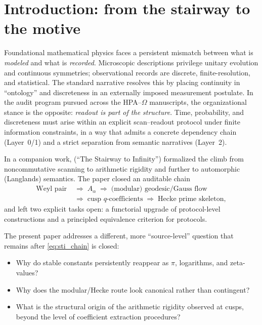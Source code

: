 
\section{Introduction: from the stairway to the motive}
\label{sec:introduction}

Foundational mathematical physics faces a persistent mismatch between what is \emph{modeled} and what is \emph{recorded}. Microscopic descriptions privilege unitary evolution and continuous symmetries; observational records are discrete, finite-resolution, and statistical. The standard narrative resolves this by placing continuity in ``ontology'' and discreteness in an externally imposed measurement postulate. In the audit program pursued across the HPA--$\Omega$ manuscripts, the organizational stance is the opposite: \emph{readout is part of the structure}. Time, probability, and discreteness must arise within an explicit scan--readout protocol under finite information constraints, in a way that admits a concrete dependency chain (Layer~0/1) and a strict separation from semantic narratives (Layer~2).

In a companion work, \cite{Ma2025STI} (``The Stairway to Infinity'') formalized the climb from noncommutative scanning to arithmetic rigidity and further to automorphic (Langlands) semantics. The paper closed an auditable chain
\begin{equation}
\label{eq:sti_chain}
\begin{aligned}
\text{Weyl pair} &\;\Longrightarrow\; A_\alpha \;\Longrightarrow\; \text{(modular) geodesic/Gauss flow}\\
&\;\Longrightarrow\; \text{cusp $q$-coefficients} \;\Longrightarrow\; \text{Hecke prime skeleton},
\end{aligned}
\end{equation}
and left two explicit tasks open: a functorial upgrade of protocol-level constructions and a principled equivalence criterion for protocols.

The present paper addresses a different, more ``source-level'' question that remains after \eqref{eq:sti_chain} is closed:
\begin{itemize}
\item Why do stable constants persistently reappear as $\pi$, logarithms, and zeta-values?
\item Why does the modular/Hecke route look canonical rather than contingent?
\item What is the structural origin of the arithmetic rigidity observed at cusps, beyond the level of coefficient extraction procedures?
\end{itemize}

